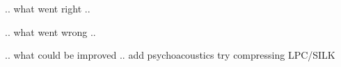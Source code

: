 .. what went right ..


.. what went wrong ..


.. what could be improved ..
add psychoacoustics
try compressing LPC/SILK
